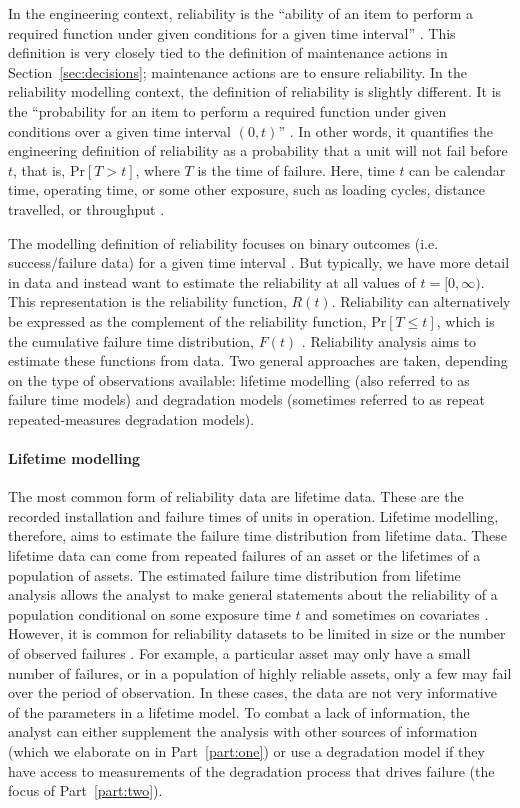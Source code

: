 In the engineering context, reliability is the ``ability of an item to perform a required function under given conditions for a given time interval'' \citep{ISO_14224_2016}. This definition is very closely tied to the definition of maintenance actions in Section~\ref{sec:decisions}; maintenance actions are to ensure reliability. In the reliability modelling context, the definition of reliability is slightly different. It is the ``probability for an item to perform a required function under given conditions over a given time interval $(0, t)$'' \citep{ISO_12489_2013}. In other words, it quantifies the engineering definition of reliability as a probability that a unit will not fail before $t$, that is, $\text{Pr}\left[T > t\right]$, where $T$ is the time of failure. Here, time $t$ can be calendar time, operating time, or some other exposure, such as loading cycles, distance travelled, or throughput \citep{lee2006}.

The modelling definition of reliability focuses on binary outcomes (i.e. success/failure data) for a given time interval \citep{hamada2008}. But typically, we have more detail in data and instead want to estimate the reliability at all values of $t = [0, \infty)$. This representation is the reliability function, $R(t)$. Reliability can alternatively be expressed as the complement of the reliability function, $\text{Pr}\left[T \le t\right]$, which is the cumulative failure time distribution, $F(t)$ \citep{Meeker2022}. Reliability analysis aims to estimate these functions from data. Two general approaches are taken, depending on the type of observations available: lifetime modelling (also referred to as failure time models) and degradation models (sometimes referred to as repeat repeated-measures degradation models).

\paragraph*{Lifetime modelling} 

The most common form of reliability data are lifetime data. These are the recorded installation and failure times of units in operation. Lifetime modelling, therefore, aims to estimate the failure time distribution from lifetime data. These lifetime data can come from repeated failures of an asset or the lifetimes of a population of assets. The estimated failure time distribution from lifetime analysis allows the analyst to make general statements about the reliability of a population conditional on some exposure time $t$ and sometimes on covariates \cite{moore2016}. However, it is common for reliability datasets to be limited in size or the number of observed failures \citep{Meeker2022}. For example, a particular asset may only have a small number of failures, or in a population of highly reliable assets, only a few may fail over the period of observation. In these cases, the data are not very informative of the parameters in a lifetime model. To combat a lack of information, the analyst can either supplement the analysis with other sources of information (which we elaborate on in Part~\ref{part:one}) or use a degradation model if they have access to measurements of the degradation process that drives failure (the focus of Part~\ref{part:two}).

